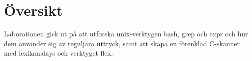 \section{Översikt}
Laborationen gick ut på att utforska unix-verktygen bash, grep och expr och hur dem använder sig av reguljära uttryck, samt att skapa en förenklad C-skanner med lexikanalays och verktyget flex. 
